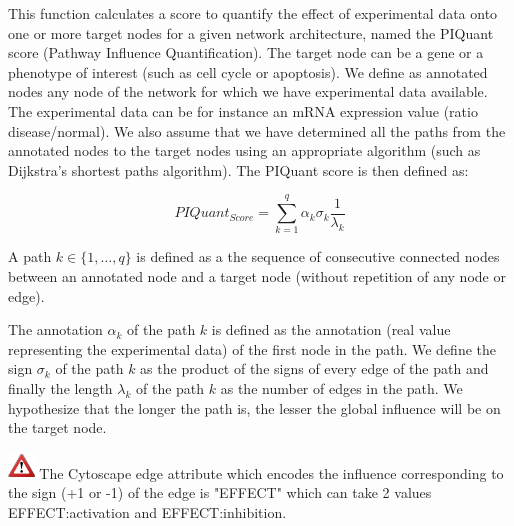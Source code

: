 
This function calculates a score to quantify the effect of experimental data
onto one or more target nodes for a given network architecture, named the
PIQuant score (Pathway Influence Quantification). The target node can be a gene
or a phenotype of interest (such as cell cycle or apoptosis). We define as
annotated nodes any node of the network for which we have experimental data
available. The experimental data can be for instance an mRNA expression value
(ratio disease/normal). We also assume that we have determined all the paths
from the annotated nodes to the target nodes using an appropriate algorithm
(such as Dijkstra's shortest paths algorithm). The PIQuant score is then defined as:


$$
 PIQuant_{Score} = \sum_{k=1}^{q} \alpha_{k} \sigma_{k} \frac{1}{\lambda_{k}}
$$

 A path $k \in \{1,\ldots , q\}$ is defined
as a the sequence of consecutive connected nodes
between an annotated node and a target node (without repetition of any node
or edge).

The annotation $\alpha_k$ of the path $k$ is defined as the annotation (real value representing the experimental data) 
of the first node in the path. We define the sign $\sigma_k$
of the path $k$ as the product of the signs of every edge of the path and finally
the length $\lambda_k$ of the path $k$ as the number of edges in the path. We
hypothesize that the longer the path is, the lesser the global influence will be
on the target node.

\includegraphics[width=20pt,height=20pt]{graphics/warning} The Cytoscape edge attribute
which encodes the influence corresponding to the sign (+1 or -1) of the edge is "EFFECT" which can take 2 values EFFECT:activation and
EFFECT:inhibition.\\\\

